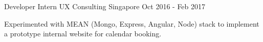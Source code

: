 \begin{cventries}
  \cventry
    {Developer Intern} %
    {UX Consulting} %
    {Singapore} %
    {Oct 2016 - Feb 2017} %
    {
      \begin{cvitems} %
        \item {Experimented with MEAN (Mongo, Express, Angular, Node) stack to implement a prototype internal website for calendar booking.}
      \end{cvitems}
    }

\end{cventries}
